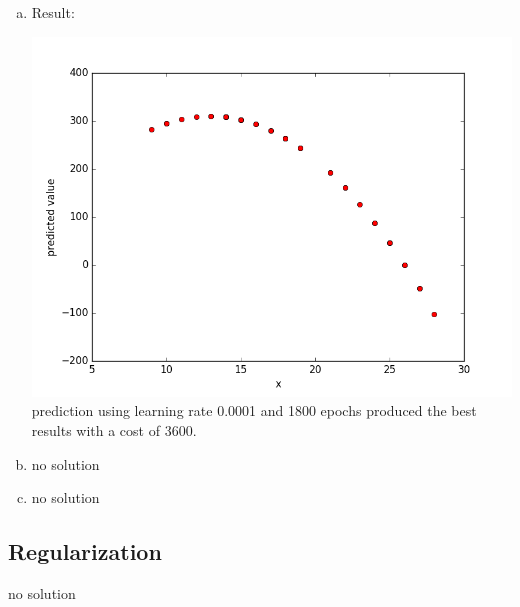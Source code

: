 \documentclass[12pt]{article}
\begin{document}
\begin{enumerate}[a)]
    \item 
        Result:\\
        \begin{center}
            \includegraphics[scale = 0.52]{pictures/twodimprediction_0,0001_1800}\\
            prediction using learning rate 0.0001 and 1800 epochs produced the best results with a cost of 3600.
        \end{center}


    \item 
        no solution

    \item 
        no solution

\end{enumerate}

\subsection{Regularization}
no solution
\end{document}
